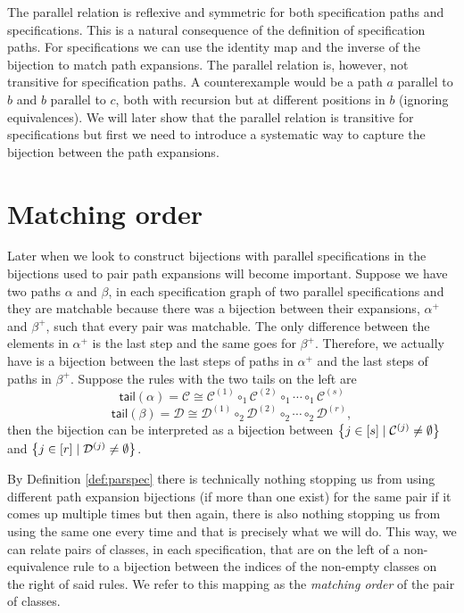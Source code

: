 The parallel relation is reflexive and symmetric for both specification paths and specifications. This is a natural consequence of the definition of specification paths. For specifications we can use the identity map and the inverse of the bijection to match path expansions. The parallel relation is, however, not transitive for specification paths. A counterexample would be a path $a$ parallel to $b$ and $b$ parallel to $c$, both with recursion but at different positions in $b$ (ignoring equivalences). We will later show that the parallel relation is transitive for specifications but first we need to introduce a systematic way to capture the bijection between the path expansions.

\section{Matching order}
Later when we look to construct bijections with parallel specifications in  the bijections used to pair path expansions will become important. Suppose we have two paths $\alpha$ and $\beta$, in each specification graph of two parallel specifications and they are matchable because there was a bijection between their expansions, $\alpha^+$ and $\beta^+$, such that every pair was matchable. The only difference between the elements in $\alpha^+$ is the last step and the same goes for $\beta^+$. Therefore, we actually have is a bijection between the last steps of paths in $\alpha^+$ and the last steps of paths in $\beta^+$. Suppose the rules with the two tails on the left are
\[
    \textsf{tail}(\alpha) = \mathcal{C} \cong \mathcal{C}^{(1)} \circ_1  \mathcal{C}^{(2)} \circ_1 \dotsm \circ_1 \mathcal{C}^{(s)}
\]
\[
    \textsf{tail}(\beta) = \mathcal{D} \cong \mathcal{D}^{(1)} \circ_2  \mathcal{D}^{(2)} \circ_2 \dotsm \circ_2 \mathcal{D}^{(r)},
\]
then the bijection can be interpreted as a bijection between $\left\{j \in [s] \mid \mathcal{C}^{(j)} \neq \emptyset\right\}$
and $\left\{j \in [r] \mid \mathcal{D}^{(j)} \neq \emptyset\right\}$.

By Definition \ref{def:parspec} there is technically nothing stopping us from using different path expansion bijections (if more than one exist) for the same pair if it comes up multiple times but then again, there is also nothing stopping us from using the same one every time and that is precisely what we will do. This way, we can relate pairs of classes, in each specification, that are on the left of a non-equivalence rule to a bijection between the indices of the non-empty classes on the right of said rules. We refer to this mapping as the \emph{matching order} of the pair of classes.

